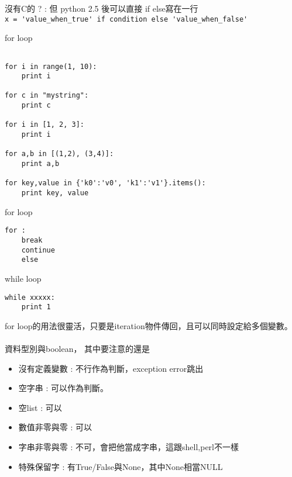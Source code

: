 沒有C的 ? : 但 python 2.5 後可以直接 if else寫在一行\\

\verb|x = 'value_when_true' if condition else 'value_when_false'|

for loop
\begin{verbatim}

for i in range(1, 10):
    print i

for c in "mystring":
    print c

for i in [1, 2, 3]:
    print i

for a,b in [(1,2), (3,4)]:
    print a,b

for key,value in {'k0':'v0', 'k1':'v1'}.items():
    print key, value
\end{verbatim}

for loop
\begin{verbatim}
for :
    break
    continue
    else
\end{verbatim}

while loop
\begin{verbatim}
while xxxxx:
    print 1
\end{verbatim}
for loop的用法很靈活，只要是iteration物件傳回，且可以同時設定給多個變數。
\\\\
資料型別與boolean， 其中要注意的還是
\begin{itemize}
\item 沒有定義變數 : 不行作為判斷，exception error跳出
\item 空字串	   : 可以作為判斷。
\item 空list       : 可以
\item 數值非零與零 : 可以
\item 字串非零與零 : 不可，會把他當成字串，這跟shell,perl不一樣
\item 特殊保留字   : 有True/False與None，其中None相當NULL
\end{itemize}

